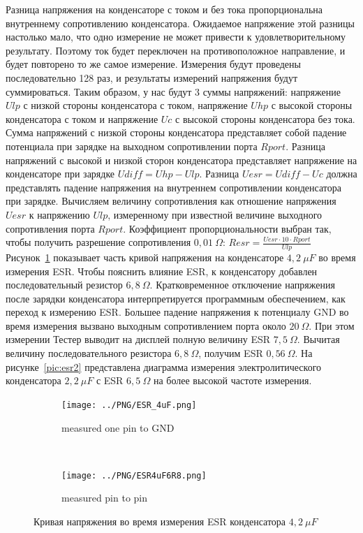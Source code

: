 Разница напряжения на конденсаторе с током и без тока пропорциональна внутреннему сопротивлению конденсатора. 
Ожидаемое напряжение этой разницы настолько мало, что одно измерение не может привести к удовлетворительному 
результату. Поэтому ток будет переключен на противоположное направление, и будет повторено то же самое измерение. 
Измерения будут проведены последовательно 128 раз, и результаты измерений напряжения будут суммироваться. Таким 
образом, у нас будут 3 суммы напряжений: напряжение \(Ulp\) с низкой стороны конденсатора с током, напряжение \(Uhp\) 
с высокой стороны конденсатора с током и напряжение \(Uc\) с высокой стороны конденсатора без тока. Сумма напряжений 
с низкой стороны конденсатора представляет собой падение потенциала при зарядке на выходном сопротивлении 
порта \(Rport\). 
Разница напряжений с высокой  и низкой сторон конденсатора представляет напряжение на конденсаторе при 
зарядке \(Udiff = Uhp - Ulp\). Разница \(Uesr = Udiff - Uc\) должна представлять падение напряжения на внутреннем 
сопротивлении конденсатора при зарядке. Вычисляем величину сопротивления как отношение напряжения \(Uesr\) к 
напряжению \(Ulp\), измеренному при известной величине выходного сопротивления порта \(Rport\).
Коэффициент пропорциональности выбран так, чтобы получить разрешение 
сопротивления \(0,01~\Omega\):  \(Resr = \frac{Uesr \cdot 10 \cdot Rport}{Ulp}\)
Рисунок~\ref{pic:esr4} показывает часть кривой напряжения на конденсаторе \(4,2~\mu F\) во время измерения ESR. 
Чтобы пояснить влияние ESR, к конденсатору добавлен последовательный резистор \(6,8~\Omega\).
Кратковременное отключение напряжения после зарядки конденсатора интерпретируется программным обеспечением, 
как переход к измерению ESR. Большее падение напряжения к потенциалу GND во время измерения вызвано выходным 
сопротивлением порта около \(20~\Omega\).
При этом измерении Тестер выводит на дисплей полную величину ESR \(7,5~\Omega\). Вычитая величину последовательного 
резистора \(6,8~\Omega\), получим ESR \(0,56~\Omega\).
На рисунке~\ref{pic:esr2} представлена диаграмма измерения электролитического конденсатора \(2,2~\mu F\) с 
ESR \(6,5~\Omega\) на более высокой частоте измерения.


\begin{figure}[H]
  \begin{subfigure}[b]{.5\textwidth}
    \centering
    \texttt{[image: ../PNG/ESR\_4uF.png]}
    \caption{measured one pin to GND}
  \end{subfigure}
  ~
  \begin{subfigure}[b]{.5\textwidth}
    \centering
    \texttt{[image: ../PNG/ESR4uF6R8.png]}
    \caption{measured pin to pin}
  \end{subfigure}
  \caption{Кривая напряжения во время измерения ESR конденсатора \(4,2~\mu F\)}
  \label{pic:esr4}
\end{figure}


